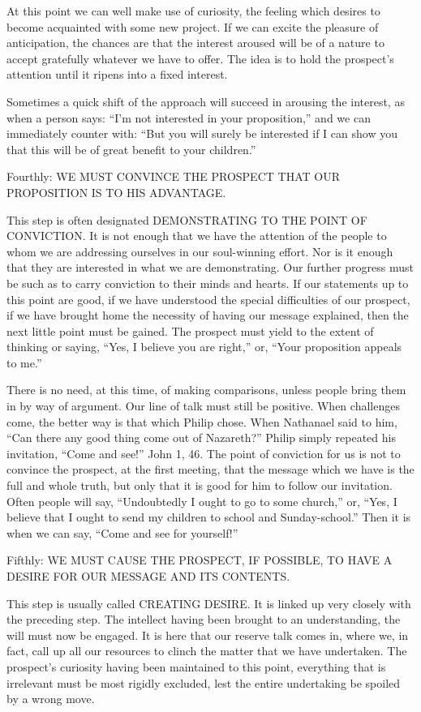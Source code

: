 \documentclass[
]{book}
\begin{document}
At this point we can well make use of curiosity, the feeling which desires to become acquainted with some new project. If we can excite the pleasure of anticipation, the chances are that the interest aroused will be of a nature to accept gratefully whatever we have to offer. The idea is to hold the prospect's attention until it ripens into a fixed interest.

Sometimes a quick shift of the approach will succeed in arousing the interest, as when a person says: ``I'm not interested in your proposition,'' and we can immediately counter with: ``But you will surely be interested if I can show you that this will be of great benefit to your children.''

Fourthly: WE MUST CONVINCE THE PROSPECT THAT OUR PROPOSITION IS TO HIS ADVANTAGE.

This step is often designated DEMONSTRATING TO THE POINT OF CONVICTION. It is not enough that we have the attention of the people to whom we are addressing ourselves in our soul-winning effort. Nor is it enough that they are interested in what we are demonstrating. Our further progress must be such as to carry conviction to their minds and hearts. If our statements up to this point are good, if we have understood the special difficulties of our prospect, if we have brought home the necessity of having our message explained, then the next little point must be gained. The prospect must yield to the extent of thinking or saying, ``Yes, I believe you are right,'' or, ``Your proposition appeals to me.''

There is no need, at this time, of making comparisons, unless people bring them in by way of argument. Our line of talk must still be positive. When challenges come, the better way is that which Philip chose. When Nathanael said to him, ``Can there any good thing come out of Nazareth?'' Philip simply repeated his invitation, ``Come and see!'' John 1, 46. The point of conviction for us is not to convince the prospect, at the first meeting, that the message which we have is the full and whole truth, but only that it is good for him to follow our invitation. Often people will say, ``Undoubtedly I ought to go to some church,'' or, ``Yes, I believe that I ought to send my children to school and Sunday-school.'' Then it is when we can say, ``Come and see for yourself!''

Fifthly: WE MUST CAUSE THE PROSPECT, IF POSSIBLE, TO HAVE A DESIRE FOR OUR MESSAGE AND ITS CONTENTS.

This step is usually called CREATING DESIRE. It is linked up very closely with the preceding step. The intellect having been brought to an understanding, the will must now be engaged. It is here that our reserve talk comes in, where we, in fact, call up all our resources to clinch the matter that we have undertaken. The prospect's curiosity having been maintained to this point, everything that is irrelevant must be most rigidly excluded, lest the entire undertaking be spoiled by a wrong move.
\end{document}
